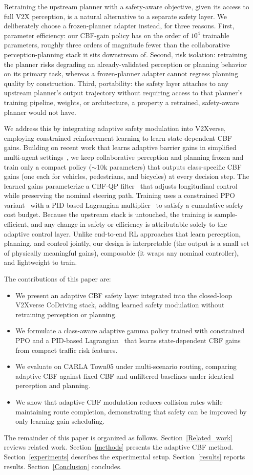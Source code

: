Retraining the upstream planner with a safety-aware objective, given its access to full V2X perception, is a natural alternative to a separate safety layer. We deliberately choose a frozen-planner adapter instead, for three reasons. First, parameter efficiency: our CBF-gain policy has on the order of $10^4$ trainable parameters, roughly three orders of magnitude fewer than the collaborative perception-planning stack it sits downstream of. Second, risk isolation: retraining the planner risks degrading an already-validated perception or planning behavior on its primary task, whereas a frozen-planner adapter cannot regress planning quality by construction. Third, portability: the safety layer attaches to any upstream planner's output trajectory without requiring access to that planner's training pipeline, weights, or architecture, a property a retrained, safety-aware planner would not have.

We address this by integrating adaptive safety modulation into V2Xverse, employing constrained reinforcement learning to learn state-dependent CBF gains. Building on recent work that learns adaptive barrier gains in simplified multi-agent settings~\cite{berducci2024las}, we keep collaborative perception and planning frozen and train only a compact policy ($\sim$10k parameters) that outputs class-specific CBF gains (one each for vehicles, pedestrians, and bicycles) at every decision step. The learned gains parameterize a CBF-QP filter~\cite{ames2017cbf} that adjusts longitudinal control while preserving the nominal steering path. Training uses a constrained PPO variant~\cite{schulman2017ppo} with a PID-based Lagrangian multiplier~\cite{stooke2020pid} to satisfy a cumulative safety cost budget. Because the upstream stack is untouched, the training is sample-efficient, and any change in safety or efficiency is attributable solely to the adaptive control layer. Unlike end-to-end RL approaches that learn perception, planning, and control jointly, our design is interpretable (the output is a small set of physically meaningful gains), composable (it wraps any nominal controller), and lightweight to train.

The contributions of this paper are:
\begin{itemize}
    \item We present an adaptive CBF safety layer integrated into the closed-loop V2Xverse CoDriving stack, adding learned safety modulation without retraining perception or planning.
    \item We formulate a class-aware adaptive gamma policy trained with constrained PPO and a PID-based Lagrangian~\cite{stooke2020pid} that learns state-dependent CBF gains from compact traffic risk features.
    \item We evaluate on CARLA Town05 under multi-scenario routing, comparing adaptive CBF against fixed CBF and unfiltered baselines under identical perception and planning.
    \item We show that adaptive CBF modulation reduces collision rates while maintaining route completion, demonstrating that safety can be improved by only learning gain scheduling.
\end{itemize}

The remainder of this paper is organized as follows. Section~\ref{Related_work} reviews related work. Section~\ref{methods} presents the adaptive CBF method. Section~\ref{experiments} describes the experimental setup. Section~\ref{results} reports results. Section~\ref{Conclusion} concludes.
